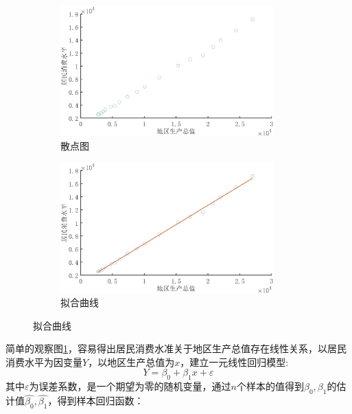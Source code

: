 \documentclass[UTF8,oneside,cs4side]{ctexart}
\begin{document}
    \begin{figure}[htb]
    	\centering
    	\begin{minipage}{1\textwidth}
    		\centering
    		\begin{subfigure}[b]{0.49\textwidth}\centering
    			\includegraphics[width=0.9\textwidth]{fig2.jpg}
    			\caption{散点图}
    			\label{fig2}
    		\end{subfigure}
    		\begin{subfigure}[b]{0.49\textwidth}\centering
    			\includegraphics[width=0.9\textwidth]{fig3.jpg}
    			\caption{拟合曲线}
    			\label{fig3}
    		\end{subfigure}
    	\end{minipage}
    \end{figure}
    简单的观察图\ref{fig2}，容易得出居民消费水准关于地区生产总值存在线性关系，以居民消费水平为因变量$Y$，以地区生产总值为$x$，建立一元线性回归模型:
    \begin{equation}
    Y=\beta_{0}+\beta_{1}x+\varepsilon
    \end{equation}
    其中$\varepsilon$为误差系数，是一个期望为零的随机变量，通过$n$个样本的值得到$\beta_{0},\beta_{1}$的估计值$\hat{\beta_{0}},\hat{\beta_{1}}$，得到样本回归函数：
\end{document}
